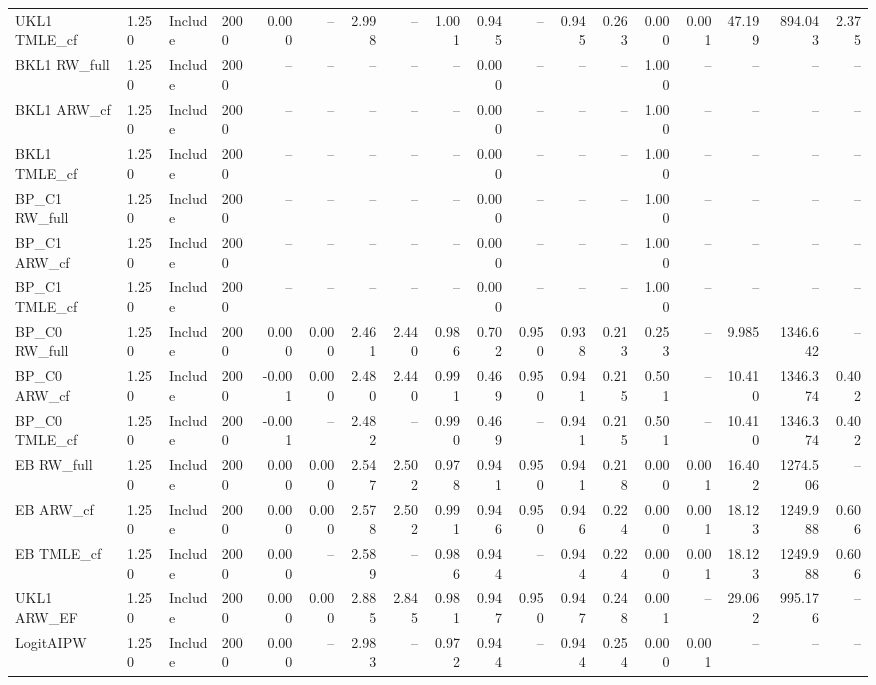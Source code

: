 \begin{tabular}{llllrrrrrrrrrrrrrr}
UKL1 TMLE\_cf & 1.250 & Include & 2000 & 0.000 & -- & 2.998 & -- & 1.001 & 0.945 & -- & 0.945 & 0.263 & 0.000 & 0.001 & 47.199 & 894.043 & 2.375 \\
BKL1 RW\_full & 1.250 & Include & 2000 & -- & -- & -- & -- & -- & 0.000 & -- & -- & -- & 1.000 & -- & -- & -- & -- \\
BKL1 ARW\_cf & 1.250 & Include & 2000 & -- & -- & -- & -- & -- & 0.000 & -- & -- & -- & 1.000 & -- & -- & -- & -- \\
BKL1 TMLE\_cf & 1.250 & Include & 2000 & -- & -- & -- & -- & -- & 0.000 & -- & -- & -- & 1.000 & -- & -- & -- & -- \\
BP\_C1 RW\_full & 1.250 & Include & 2000 & -- & -- & -- & -- & -- & 0.000 & -- & -- & -- & 1.000 & -- & -- & -- & -- \\
BP\_C1 ARW\_cf & 1.250 & Include & 2000 & -- & -- & -- & -- & -- & 0.000 & -- & -- & -- & 1.000 & -- & -- & -- & -- \\
BP\_C1 TMLE\_cf & 1.250 & Include & 2000 & -- & -- & -- & -- & -- & 0.000 & -- & -- & -- & 1.000 & -- & -- & -- & -- \\
BP\_C0 RW\_full & 1.250 & Include & 2000 & 0.000 & 0.000 & 2.461 & 2.440 & 0.986 & 0.702 & 0.950 & 0.938 & 0.213 & 0.253 & -- & 9.985 & 1346.642 & -- \\
BP\_C0 ARW\_cf & 1.250 & Include & 2000 & -0.001 & 0.000 & 2.480 & 2.440 & 0.991 & 0.469 & 0.950 & 0.941 & 0.215 & 0.501 & -- & 10.410 & 1346.374 & 0.402 \\
BP\_C0 TMLE\_cf & 1.250 & Include & 2000 & -0.001 & -- & 2.482 & -- & 0.990 & 0.469 & -- & 0.941 & 0.215 & 0.501 & -- & 10.410 & 1346.374 & 0.402 \\
EB RW\_full & 1.250 & Include & 2000 & 0.000 & 0.000 & 2.547 & 2.502 & 0.978 & 0.941 & 0.950 & 0.941 & 0.218 & 0.000 & 0.001 & 16.402 & 1274.506 & -- \\
EB ARW\_cf & 1.250 & Include & 2000 & 0.000 & 0.000 & 2.578 & 2.502 & 0.991 & 0.946 & 0.950 & 0.946 & 0.224 & 0.000 & 0.001 & 18.123 & 1249.988 & 0.606 \\
EB TMLE\_cf & 1.250 & Include & 2000 & 0.000 & -- & 2.589 & -- & 0.986 & 0.944 & -- & 0.944 & 0.224 & 0.000 & 0.001 & 18.123 & 1249.988 & 0.606 \\
UKL1 ARW\_EF & 1.250 & Include & 2000 & 0.000 & 0.000 & 2.885 & 2.845 & 0.981 & 0.947 & 0.950 & 0.947 & 0.248 & 0.001 & -- & 29.062 & 995.176 & -- \\
LogitAIPW & 1.250 & Include & 2000 & 0.000 & -- & 2.983 & -- & 0.972 & 0.944 & -- & 0.944 & 0.254 & 0.000 & 0.001 & -- & -- & -- \\

\end{tabular}
